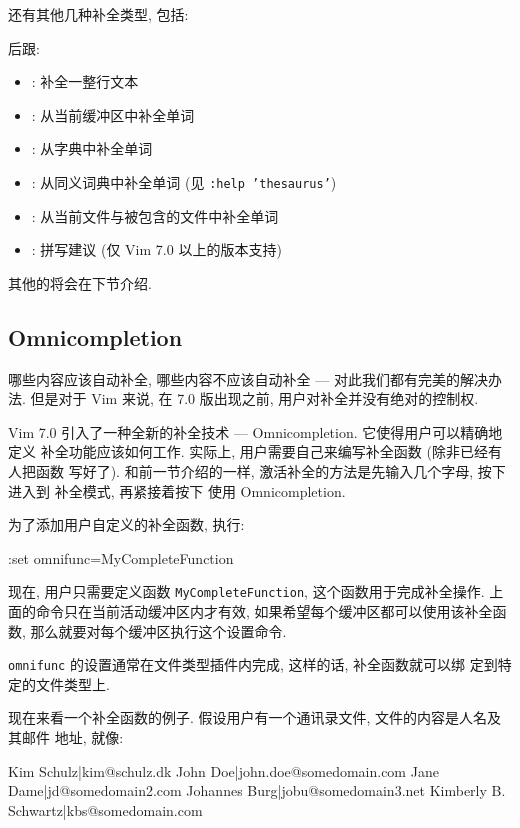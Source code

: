 还有其他几种补全类型, 包括:

 后跟:
\begin{itemize}
    \item {}: 补全一整行文本
    \item {}: 从当前缓冲区中补全单词
    \item {}: 从字典中补全单词
    \item {}: 从同义词典中补全单词 (见 \texttt{:help 'thesaurus'})
    \item {}: 从当前文件与被包含的文件中补全单词
    \item {}: 拼写建议 (仅 Vim 7.0 以上的版本支持)
\end{itemize}

其他的将会在下节介绍.

\subsection{Omnicompletion}
\label{subsec:omnicompletion}

哪些内容应该自动补全, 哪些内容不应该自动补全 --- 对此我们都有完美的解决办法.
但是对于 Vim 来说, 在 7.0 版出现之前, 用户对补全并没有绝对的控制权.

Vim 7.0 引入了一种全新的补全技术 --- Omnicompletion. 它使得用户可以精确地定义
补全功能应该如何工作. 实际上, 用户需要自己来编写补全函数 (除非已经有人把函数
写好了).
和前一节介绍的一样, 激活补全的方法是先输入几个字母, 按下  进入到
补全模式, 再紧接着按下  使用 Omnicompletion.

为了添加用户自定义的补全函数, 执行:
\begin{vimcode}
:set omnifunc=MyCompleteFunction
\end{vimcode}
现在, 用户只需要定义函数 \texttt{MyCompleteFunction}, 这个函数用于完成补全操作.
上面的命令只在当前活动缓冲区内才有效, 如果希望每个缓冲区都可以使用该补全函数,
那么就要对每个缓冲区执行这个设置命令.
\begin{warning}
    \texttt{omnifunc} 的设置通常在文件类型插件内完成, 这样的话, 补全函数就可以绑
    定到特定的文件类型上.
\end{warning}

现在来看一个补全函数的例子. 假设用户有一个通讯录文件, 文件的内容是人名及其邮件
地址, 就像:
\begin{vimcode}
Kim Schulz|kim@schulz.dk
John Doe|john.doe@somedomain.com
Jane Dame|jd@somedomain2.com
Johannes Burg|jobu@somedomain3.net
Kimberly B. Schwartz|kbs@somedomain.com
\end{vimcode}


